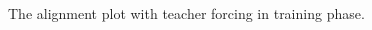 \documentclass{article} %
\begin{document}
\begin{CJK}{UTF8}{bsmi}
\begin{figure}[h]
\begin{center}
\end{center}
\caption{The alignment plot with teacher forcing in training phase.}
\end{figure}


\end{CJK}
\end{document}
